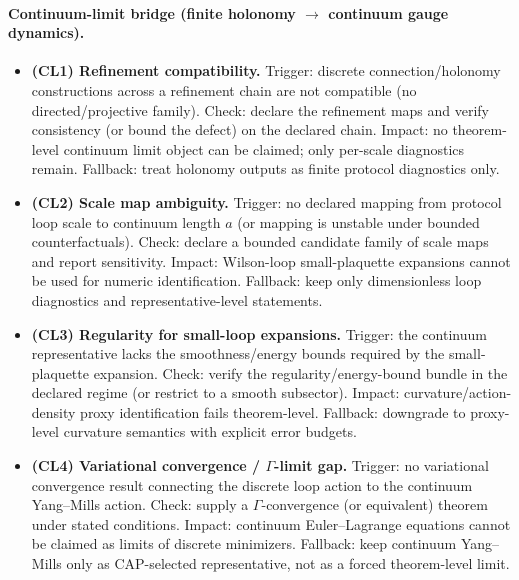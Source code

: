 \paragraph{Continuum-limit bridge (finite holonomy $\rightarrow$ continuum gauge dynamics).}
\begin{itemize}
\item \textbf{(CL1) Refinement compatibility.}
  Trigger: discrete connection/holonomy constructions across a refinement chain are not compatible (no directed/projective family).
  Check: declare the refinement maps and verify consistency (or bound the defect) on the declared chain.
  Impact: no theorem-level continuum limit object can be claimed; only per-scale diagnostics remain.
  Fallback: treat holonomy outputs as finite protocol diagnostics only.
\item \textbf{(CL2) Scale map ambiguity.}
  Trigger: no declared mapping from protocol loop scale to continuum length $a$ (or mapping is unstable under bounded counterfactuals).
  Check: declare a bounded candidate family of scale maps and report sensitivity.
  Impact: Wilson-loop small-plaquette expansions cannot be used for numeric identification.
  Fallback: keep only dimensionless loop diagnostics and representative-level statements.
\item \textbf{(CL3) Regularity for small-loop expansions.}
  Trigger: the continuum representative lacks the smoothness/energy bounds required by the small-plaquette expansion.
  Check: verify the regularity/energy-bound bundle in the declared regime (or restrict to a smooth subsector).
  Impact: curvature/action-density proxy identification fails theorem-level.
  Fallback: downgrade to proxy-level curvature semantics with explicit error budgets.
\item \textbf{(CL4) Variational convergence / $\Gamma$-limit gap.}
  Trigger: no variational convergence result connecting the discrete loop action to the continuum Yang--Mills action.
  Check: supply a $\Gamma$-convergence (or equivalent) theorem under stated conditions.
  Impact: continuum Euler--Lagrange equations cannot be claimed as limits of discrete minimizers.
  Fallback: keep continuum Yang--Mills only as CAP-selected representative, not as a forced theorem-level limit.
\end{itemize}

